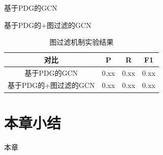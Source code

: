 基于PDG的GCN

基于PDG的+图过滤的GCN


\begin{table}
  \centering
  \caption{图过滤机制实验结果} %
  \begin{tabular*}{0.9\textwidth}{@{\extracolsep{\fill}}cccc}
  \toprule
    对比			&P		&R		&F1 \\
  \midrule
    基于PDG的GCN			&0.xx	&0.xx		&0.xx \\
    基于PDG的+图过滤的GCN			&0.xx		&0.xx		&0.xx \\
  \bottomrule
  \end{tabular*}
\end{table}

\section{本章小结}
\label{sec:Summary5}
本章




